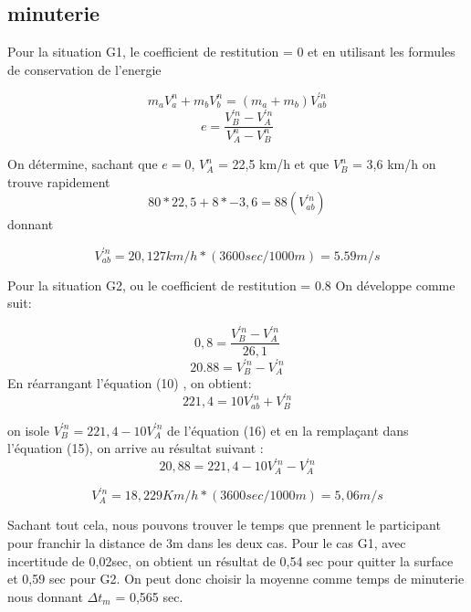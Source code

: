 \documentclass{article}
\begin{document}
 
 \subsection{minuterie}
 Pour la situation G1, le coefficient de restitution = 0 et
 en utilisant les formules de conservation de l'energie 
 
 \begin{equation}
 m_{a}V_{a}^{n} + m_{b}V_{b}^{n} =( m_{a} + m_{b})V_{ab}^{'n} 
 \end{equation}
 \begin{equation}
 e = \frac {V_{B}^{'n}-V_{A}^{'n}}{V_{A}^{n}-V_{B}^{n}} 
\end{equation}  

 On détermine, sachant que $ e = 0$, $ V_{A}^{n}$ = 22,5 km/h et que  $V_{B}^{n}$ = 3,6 km/h on trouve rapidement
 \begin{equation}
  80*22,5 +8*-3,6 = 88(V_{ab}^{'n})
\end{equation}  
donnant

\begin{equation}
V_{ab}^{'n} = 20,127 km/h * (3600sec/1000m) = 5.59 m/s
\end{equation}


\vspace*{4mm}
 Pour la situation G2, ou le coefficient de restitution = 0.8 On développe comme suit:

 \begin{equation}
 0,8 = \frac{V_{B}^{'n}-V_{A}^{'n}}{26,1}
\end{equation} 
 \begin{equation}
 20.88 = V_{B}^{'n}-V_{A}^{'n} 
\end{equation} 
En réarrangant l'équation (10) , on obtient:
 \begin{equation}
 221,4 = 10V_{ab}^{'n}+V_{B}^{'n}
\end{equation} 

on isole  $V_{B}^{'n} = 221,4 - 10V_{A}^{'n}$ de l'équation (16) et en la remplaçant dans l'équation (15), on arrive au résultat suivant :
\begin{equation}
  20,88 = {221,4 - 10V_{A}^{'n}-V_{A}^{'n}}
\end{equation}

\begin{equation}
  V_{A}^{'n} = 18,229 Km/h *(3600sec/1000m) = 5,06 m/s
\end{equation}
\vspace*{4mm}

Sachant tout cela, nous pouvons trouver le temps que prennent le participant pour franchir la distance de 3m dans les deux cas. Pour le cas G1, avec incertitude de 0,02sec, on obtient un résultat de 0,54 sec pour quitter la surface et 0,59 sec pour G2. On peut donc choisir la moyenne comme temps de minuterie nous donnant  $\Delta t_{m}$ = 0,565 sec.
 
\end{document}
